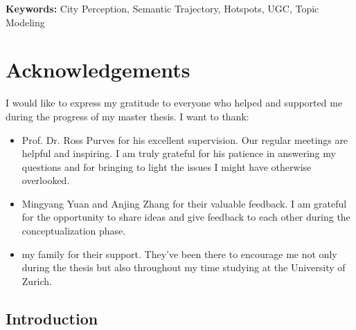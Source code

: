 \documentclass{article}
\theoremstyle{remark}
\begin{document}
\textbf{Keywords:} City Perception, Semantic Trajectory, Hotspots, UGC, Topic Modeling

\newpage


\chapter{\Large\textbf{Acknowledgements}}

\vspace{3cm}

I would like to express my gratitude to everyone who helped and supported me during the progress of my master thesis. I want to thank:

\begin{itemize}
    \item Prof. Dr. Ross Purves for his excellent supervision. Our regular meetings are helpful and inspiring. I am truly grateful for his patience in answering my questions and for bringing to light the issues I might have otherwise overlooked.
    \item Mingyang Yuan and Anjing Zhang for their valuable feedback. I am grateful for the opportunity to share ideas and give feedback to each other during the conceptualization phase.
    \item my family for their support. They've been there to encourage me not only during the thesis but also throughout my time studying at the University of Zurich.
\end{itemize}


\newpage


\tableofcontents
\newpage

\listoffigures
\newpage

\listoftables
\newpage

\printglossary[type=\acronymtype]
\newpage


\pagestyle{fancy}

\section{Introduction}

\end{document}
